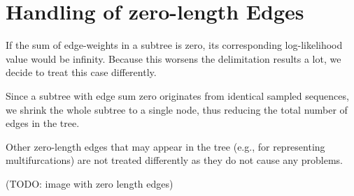 \documentclass{llncs}
\begin{document}
\section{Handling of zero-length Edges}

If the sum of edge-weights in a subtree is zero, its corresponding log-likelihood value would be infinity. Because this worsens the delimitation results a lot, we decide to treat this case differently.

Since a subtree with edge sum zero originates from identical sampled sequences, we shrink the whole subtree to a single node, thus reducing the total number of edges in the tree.

Other zero-length edges that may appear in the tree (e.g., for representing multifurcations) are not treated differently as they do not cause any problems.

(TODO: image with zero length edges)



\end{document}
